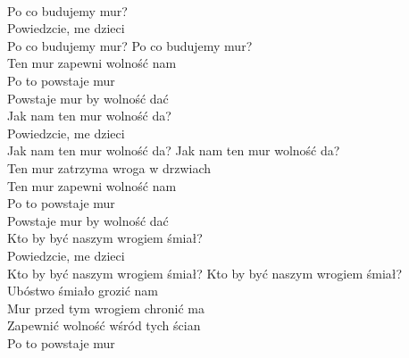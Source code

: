 \begin{flushleft}
\\
Po co budujemy mur? \\
Powiedzcie, me dzieci \\
Po co budujemy mur? 
\vskip 3mm
\hspace{0.9cm}Po co budujemy mur? \tab{}\\
\hspace{0.9cm}Ten mur zapewni wolność nam \\
\hspace{0.9cm}Po to powstaje mur \tab{}\\
\hspace{0.9cm}Powstaje mur by wolność dać 
\vskip 3mm
\\
Jak nam ten mur wolność da?\\
Powiedzcie, me dzieci\\
Jak nam ten mur wolność da?
\vskip 3mm
\hspace{0.9cm}Jak nam ten mur wolność da?\\
\hspace{0.9cm}Ten mur zatrzyma wroga w drzwiach\\
\hspace{0.9cm}Ten mur zapewni wolność nam\\
\hspace{0.9cm}Po to powstaje mur\\
\hspace{0.9cm}Powstaje mur by wolność dać
\vskip 3mm
\\
Kto by być naszym wrogiem śmiał?\\
Powiedzcie, me dzieci\\
Kto by być naszym wrogiem śmiał?
\vskip 3mm
\hspace{0.9cm}Kto by być naszym wrogiem śmiał?\\
\hspace{0.9cm}Ubóstwo śmiało grozić nam\\
\hspace{0.9cm}Mur przed tym wrogiem chronić ma\\
\hspace{0.9cm}Zapewnić wolność wśród tych ścian\\
\hspace{0.9cm}Po to powstaje mur\\

\end{flushleft}

